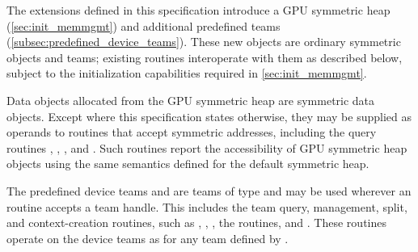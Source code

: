 
The extensions defined in this specification introduce a \ac{GPU} symmetric heap
(\cref{sec:init_memmgmt}) and additional predefined teams
(\cref{subsec:predefined_device_teams}). These new objects are ordinary
\openshmem symmetric objects and teams; existing  routines
interoperate with them as described below, subject to the initialization
capabilities required in \cref{sec:init_memmgmt}.

Data objects allocated from the \ac{GPU} symmetric heap are \openshmem symmetric
data objects. Except where this specification states otherwise, they may be
supplied as operands to  routines that accept symmetric addresses,
including the query routines , ,
, and . Such routines
report the accessibility of \ac{GPU} symmetric heap objects using the same
semantics defined for the default symmetric heap.

The predefined device teams  and
 are teams of type  and
may be used wherever an  routine accepts a team handle. This
includes the team query, management, split, and context-creation routines, such
as , ,
, the  routines, and
. These routines operate on the device teams as
for any team defined by .
